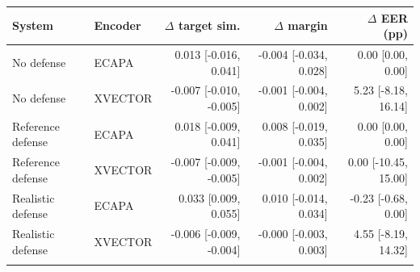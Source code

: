 \begin{tabular}{llrrr}
\toprule
System & Encoder & $\Delta$ target sim. & $\Delta$ margin & $\Delta$ EER (pp) \\
\midrule
No defense & ECAPA & 0.013 [-0.016, 0.041] & -0.004 [-0.034, 0.028] & 0.00 [0.00, 0.00] \\
No defense & XVECTOR & -0.007 [-0.010, -0.005] & -0.001 [-0.004, 0.002] & 5.23 [-8.18, 16.14] \\
\addlinespace
Reference defense & ECAPA & 0.018 [-0.009, 0.041] & 0.008 [-0.019, 0.035] & 0.00 [0.00, 0.00] \\
Reference defense & XVECTOR & -0.007 [-0.009, -0.005] & -0.001 [-0.004, 0.002] & 0.00 [-10.45, 15.00] \\
\addlinespace
Realistic defense & ECAPA & 0.033 [0.009, 0.055] & 0.010 [-0.014, 0.034] & -0.23 [-0.68, 0.00] \\
Realistic defense & XVECTOR & -0.006 [-0.009, -0.004] & -0.000 [-0.003, 0.003] & 4.55 [-8.19, 14.32] \\
\addlinespace
\bottomrule
\end{tabular}
